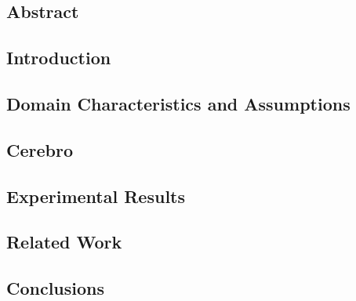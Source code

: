\subsection{Abstract}


\subsection{Introduction}
\label{sec:cerbro_intro}


\subsection{Domain Characteristics and Assumptions}
\label{sec:cerebro_approach}



\subsection{Cerebro}
\label{sec:cerebro_design}


\subsection{Experimental Results}
\label{sec:cerebro_results}


\subsection{Related Work}
\label{sec:cerebro_related_work}


\subsection{Conclusions}
\label{sec:cerebro_conclusions}

